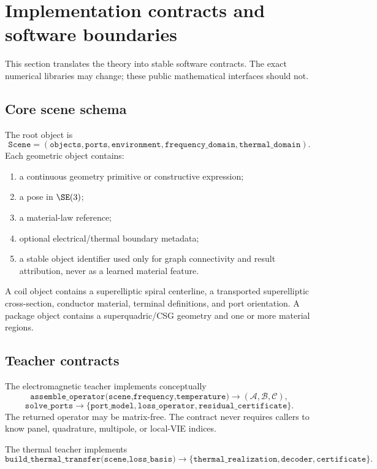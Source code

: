 \section{Implementation contracts and software boundaries}

This section translates the theory into stable software contracts. The exact
numerical libraries may change; these public mathematical interfaces should
not.

\subsection{Core scene schema}

The root object is
\[
  \texttt{Scene}
  =
  (\texttt{objects},\texttt{ports},\texttt{environment},
   \texttt{frequency\_domain},\texttt{thermal\_domain}).
\]
Each geometric object contains:
\begin{enumerate}
\item a continuous geometry primitive or constructive expression;
\item a pose in $\SE(3)$;
\item a material-law reference;
\item optional electrical/thermal boundary metadata;
\item a stable object identifier used only for graph connectivity and result
      attribution, never as a learned material feature.
\end{enumerate}

A coil object contains a superelliptic spiral centerline, a transported
superelliptic cross-section, conductor material, terminal definitions, and port
orientation. A package object contains a superquadric/CSG geometry and one or
more material regions.

\subsection{Teacher contracts}

The electromagnetic teacher implements conceptually
\[
 \texttt{assemble\_operator(scene,frequency,temperature)}
 \longrightarrow
 (\mathcal A,\mathcal B,\mathcal C),
\]
\[
 \texttt{solve\_ports}
 \longrightarrow
 \{\texttt{port\_model},\texttt{loss\_operator},
   \texttt{residual\_certificate}\}.
\]
The returned operator may be matrix-free. The contract never requires callers
to know panel, quadrature, multipole, or local-VIE indices.

The thermal teacher implements
\[
 \texttt{build\_thermal\_transfer(scene,loss\_basis)}
 \longrightarrow
 \{\texttt{thermal\_realization},\texttt{decoder},
   \texttt{certificate}\}.
\]

